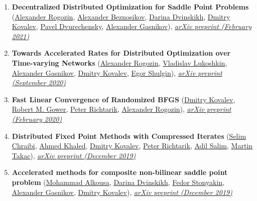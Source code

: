\begin{enumerate}
\item \textbf{Decentralized Distributed Optimization for Saddle Point Problems} (\href{https://scholar.google.com/citations?user=sEjyzkgAAAAJ}{\color{linkcolour}Alexander Rogozin}, \href{https://anbeznosikov.github.io}{\color{linkcolour}Alexander Beznosikov}, \href{https://scholar.google.com/citations?user=5ILnTRsAAAAJ}{\color{linkcolour}Darina Dvinskikh}, \href{https://www.dmitry-kovalev.com}{\color{linkcolour}Dmitry Kovalev}, \href{http://wias-berlin.de/people/dvureche/}{\color{linkcolour}Pavel Dvurechensky}, \href{https://scholar.google.ru/citations?user=AmeE8qkAAAAJ}{\color{linkcolour}Alexander Gasnikov}), \href{https://arxiv.org/abs/2102.07758}{\em \color{black}arXiv preprint (February 2021)}
\item \textbf{Towards Accelerated Rates for Distributed Optimization over Time-varying Networks} (\href{https://scholar.google.com/citations?user=sEjyzkgAAAAJ}{\color{linkcolour}Alexander Rogozin}, \href{}{\color{linkcolour}Vladislav Lukoshkin}, \href{https://scholar.google.ru/citations?user=AmeE8qkAAAAJ}{\color{linkcolour}Alexander Gasnikov}, \href{https://www.dmitry-kovalev.com}{\color{linkcolour}Dmitry Kovalev}, \href{https://shulgin-egor.github.io}{\color{linkcolour}Egor Shulgin}), \href{https://arxiv.org/abs/2009.11069}{\em \color{black}arXiv preprint (September 2020)}
\item \textbf{Fast Linear Convergence of Randomized BFGS} (\href{https://www.dmitry-kovalev.com}{\color{linkcolour}Dmitry Kovalev}, \href{https://gowerrobert.github.io}{\color{linkcolour}Robert M. Gower}, \href{https://richtarik.org}{\color{linkcolour}Peter Richtarik}, \href{https://scholar.google.com/citations?user=sEjyzkgAAAAJ}{\color{linkcolour}Alexander Rogozin}), \href{https://arxiv.org/abs/2002.11337}{\em \color{black}arXiv preprint (February 2020)}
\item \textbf{Distributed Fixed Point Methods with Compressed Iterates} (\href{https://scholar.google.com/citations?user=gyiubRkAAAAJ}{\color{linkcolour}Selim Chraibi}, \href{https://rka97.github.io}{\color{linkcolour}Ahmed Khaled}, \href{https://www.dmitry-kovalev.com}{\color{linkcolour}Dmitry Kovalev}, \href{https://richtarik.org}{\color{linkcolour}Peter Richtarik}, \href{https://adil-salim.github.io}{\color{linkcolour}Adil Salim}, \href{https://mtakac.com}{\color{linkcolour}Martin Takac}), \href{https://arxiv.org/abs/1912.09925}{\em \color{black}arXiv preprint (December 2019)}
\item \textbf{Accelerated methods for composite non-bilinear saddle point problem} (\href{https://scholar.google.com/citations?user=dJgWojUAAAAJ}{\color{linkcolour}Mohammad Alkousa}, \href{https://scholar.google.com/citations?user=5ILnTRsAAAAJ}{\color{linkcolour}Darina Dvinskikh}, \href{https://www.researchgate.net/profile/Fedor_Stonyakin}{\color{linkcolour}Fedor Stonyakin}, \href{https://scholar.google.ru/citations?user=AmeE8qkAAAAJ}{\color{linkcolour}Alexander Gasnikov}, \href{https://www.dmitry-kovalev.com}{\color{linkcolour}Dmitry Kovalev}), \href{https://arxiv.org/abs/1906.03620}{\em \color{black}arXiv preprint (December 2019)}

\end{enumerate}
